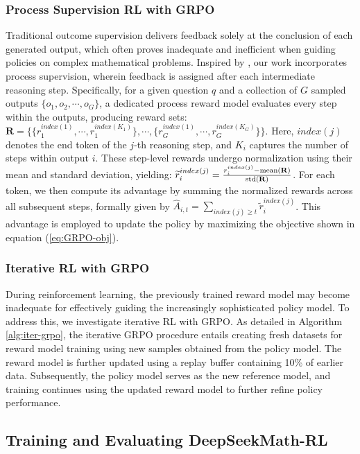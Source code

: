 \begin{itemize}[topsep=0pt]
\subsubsection{Process Supervision RL with GRPO} Traditional outcome supervision delivers feedback solely at the conclusion of each generated output, which often proves inadequate and inefficient when guiding policies on complex mathematical problems. Inspired by \cite{wang2023math}, our work incorporates process supervision, wherein feedback is assigned after each intermediate reasoning step. Specifically, for a given question $q$ and a collection of $G$ sampled outputs $\{o_1, o_2, \cdots, o_G\}$, a dedicated process reward model evaluates every step within the outputs, producing reward sets: $\mathbf{R} = \{ \{r_1^{index(1)},\cdots,r_1^{index(K_1)}\}, \cdots,  \{r_G^{index(1)},\cdots,r_G^{index(K_G)}\} \}$. Here, $index(j)$ denotes the end token of the $j$-th reasoning step, and $K_i$ captures the number of steps within output $i$. These step-level rewards undergo normalization using their mean and standard deviation, yielding: $\widetilde{r}_i^{index(j)} = \frac{r_i^{index(j)} - {\rm mean(\mathbf{R})}}{{\rm std(\mathbf{R})}}$.
For each token, we then compute its advantage by summing the normalized rewards across all subsequent steps, formally given by $\hat{A}_{i, t} = \sum_{index(j) \ge t} \widetilde{r}_i^{index(j)}$. This advantage is employed to update the policy by maximizing the objective shown in equation (\ref{eq:GRPO-obj}).

\subsubsection{Iterative RL with GRPO} During reinforcement learning, the previously trained reward model may become inadequate for effectively guiding the increasingly sophisticated policy model. To address this, we investigate iterative RL with GRPO. As detailed in Algorithm \ref{alg:iter-grpo}, the iterative GRPO procedure entails creating fresh datasets for reward model training using new samples obtained from the policy model. The reward model is further updated using a replay buffer containing 10\% of earlier data. Subsequently, the policy model serves as the new reference model, and training continues using the updated reward model to further refine policy performance.

\subsection{Training and Evaluating DeepSeekMath-RL}


\end{itemize}
